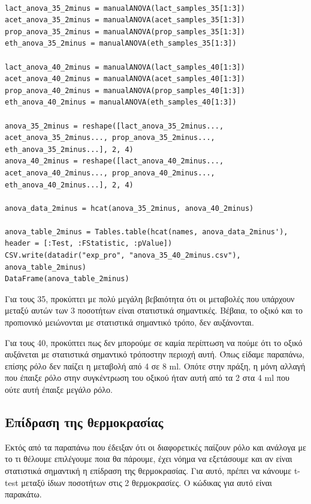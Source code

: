 \documentclass[11pt]{article}
\begin{document}
\begin{verbatim}

lact_anova_35_2minus = manualANOVA(lact_samples_35[1:3])
acet_anova_35_2minus = manualANOVA(acet_samples_35[1:3])
prop_anova_35_2minus = manualANOVA(prop_samples_35[1:3])
eth_anova_35_2minus = manualANOVA(eth_samples_35[1:3])

lact_anova_40_2minus = manualANOVA(lact_samples_40[1:3])
acet_anova_40_2minus = manualANOVA(acet_samples_40[1:3])
prop_anova_40_2minus = manualANOVA(prop_samples_40[1:3])
eth_anova_40_2minus = manualANOVA(eth_samples_40[1:3])

anova_35_2minus = reshape([lact_anova_35_2minus..., acet_anova_35_2minus..., prop_anova_35_2minus..., eth_anova_35_2minus...], 2, 4)
anova_40_2minus = reshape([lact_anova_40_2minus..., acet_anova_40_2minus..., prop_anova_40_2minus..., eth_anova_40_2minus...], 2, 4)

anova_data_2minus = hcat(anova_35_2minus, anova_40_2minus)

anova_table_2minus = Tables.table(hcat(names, anova_data_2minus'), header = [:Test, :FStatistic, :pValue])
CSV.write(datadir("exp_pro", "anova_35_40_2minus.csv"), anova_table_2minus)
DataFrame(anova_table_2minus)

\end{verbatim}

Για τους 35, προκύπτει με πολύ μεγάλη βεβαιότητα ότι οι μεταβολές που υπάρχουν μεταξύ αυτών των 3 ποσοτήτων είναι στατιστικά σημαντικές. Βέβαια, το οξικό και το προπιονικό μειώνονται με στατιστικά σημαντικό τρόπο, δεν αυξάνονται.

Για τους 40, προκύπτει πως δεν μπορούμε σε καμία περίπτωση να πούμε ότι το οξικό αυξάνεται με στατιστικά σημαντικό τρόποστην περιοχή αυτή. Όπως είδαμε παραπάνω, επίσης ρόλο δεν παίζει η μεταβολή από 4 σε 8 ml. Οπότε στην πράξη, η μόνη αλλαγή που έπαιξε ρόλο στην συγκέντρωση του οξικού ήταν αυτή από τα 2 στα 4 ml που ούτε αυτή έπαιξε μεγάλο ρόλο.

\subsection{Επίδραση της θερμοκρασίας}
\label{sec:orge31d411}
Εκτός από τα παραπάνω που έδειξαν ότι οι διαφορετικές παίζουν ρόλο και ανάλογα με το τι θέλουμε επιλέγουμε ποια θα πάρουμε, έχει νόημα να εξετάσουμε και αν είναι στατιστικά σημαντική η επίδραση της θερμοκρασίας. Για αυτό, πρέπει να κάνουμε t-test μεταξύ ίδιων ποσοτήτων στις 2 θερμοκρασίες. Ο κώδικας για αυτό είναι παρακάτω.
\end{document}
